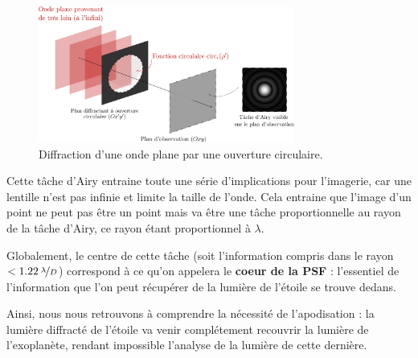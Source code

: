 \begin{figure}[htbp]
    \centering
    \includegraphics[width=0.75\textwidth]{figures/diff_expl.png}
    \caption{Diffraction d'une onde plane par une ouverture circulaire.}
\end{figure}




Cette tâche d’Airy entraine toute une série d’implications pour l’imagerie, car une lentille n’est pas
infinie et limite la taille de l’onde. Cela entraine que l’image d’un point ne peut pas être un point mais
va être une tâche proportionnelle au rayon de la tâche d’Airy, ce rayon étant proportionnel à $\lambda$. %

Globalement, le centre de cette tâche (soit l'information compris dans le rayon $< 1.22\: \nicefrac{\lambda}{D}$) correspond à ce qu'on appelera le \textbf{coeur de la PSF} : l'essentiel de l'information que l'on peut récupérer de la lumière de l'étoile se trouve dedans.


Ainsi, nous nous retrouvons à comprendre la nécessité de l'apodisation : la lumière diffracté de l'étoile va venir complétement recouvrir la lumière de l'exoplanète, rendant impossible l'analyse de la lumière de cette dernière. 

